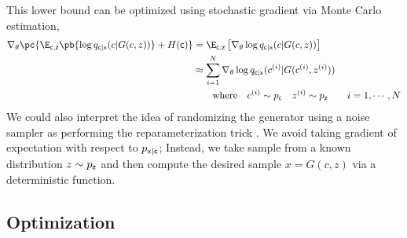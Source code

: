 \documentclass[11pt]{article}
\begin{document}
This lower bound can be optimized using stochastic gradient via Monte Carlo estimation,
\begin{align*}
    \nabla_{\theta} \pc{ \E_{\rc,\rz} \pb{ \log q_{\rc|\rx}(c|G(c,z)) } + H(\rc) } 
        &= \E_{\rc,\rz} \left[ \nabla_{\theta} \log q_{\rc|\rx}(c|G(c,z)) \right] \\
        &\approx \sum_{i=1}^N  \nabla_{\theta} \log q_{\rc|\rx}(c^{(i)}|G(c^{(i)},z^{(i)})) \\
        &\quad\quad\text{where} \quad c^{(i)} \sim p_{\rc} \quad z^{(i)} \sim p_{\rz} \quad\quad i=1,\cdots,N
\end{align*}
We could also interpret the idea of randomizing the generator using a noise sampler as performing the reparameterization trick \cite{kingmaAutoEncodingVariationalBayes2014}. We avoid taking gradient of expectation with respect to $p_{\mathsf{x}|\mathsf{c}}$; Instead, we take sample from a known distribution $z\sim p_{\mathsf{z}}$ and then compute the desired sample $x = G(c,z)$ via a deterministic function.



\subsection{Optimization}
\end{document}
